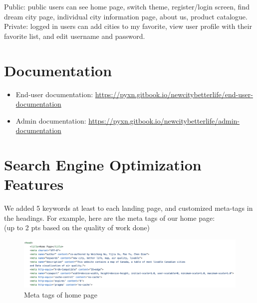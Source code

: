 \documentclass[12pt, letterpaper]{article}
\begin{document}
Public: public users can see home page, switch theme, register/login screen, find dream city page, individual city information page, about us, product catalogue.
Private: logged in users can add cities to my favorite, view user profile with their favorite list, and edit username and password.

\section{Documentation}

\begin{itemize}
	\item End-user documentation:	\url{https://pyxn.gitbook.io/newcitybetterlife/end-user-documentation}
	\item Admin documentation: 		\url{https://pyxn.gitbook.io/newcitybetterlife/admin-documentation}
\end{itemize}

\section{Search Engine Optimization Features}
We added 5 keywords at least to each landing page, and customized meta-tags in the headings.
For example, here are the meta tags of our home page:
\\(up to 2 pts based on the quality of work done)

\begin{figure}[htbp]
	\centering
	\includegraphics[width=6in]{images/q11.png}
	\caption{Meta tags of home page}
 \end{figure}

 \newpage

\end{document}
